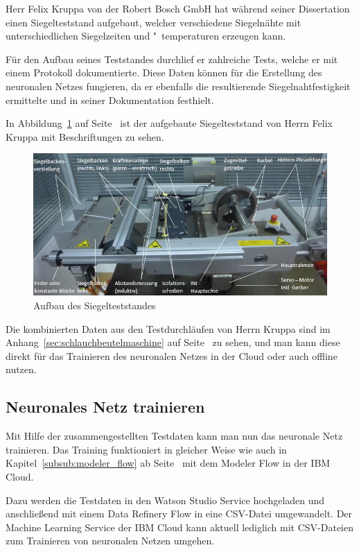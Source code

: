 Herr Felix Kruppa von der Robert Bosch GmbH hat während seiner Dissertation einen Siegelteststand aufgebaut, welcher
verschiedene Siegelnähte mit unterschiedlichen Siegelzeiten und "~temperaturen erzeugen kann.

Für den Aufbau seines Teststandes durchlief er zahlreiche Tests, welche er mit einem Protokoll dokumentierte. Diese
Daten können für die Erstellung des neuronalen Netzes fungieren, da er ebenfalls die resultierende Siegelnahtfestigkeit
ermittelte und in seiner Dokumentation festhielt.

In Abbildung~\ref{fig:siegelmaschinen_vffs_simulator} auf Seite~\pageref{fig:siegelmaschinen_vffs_simulator} ist der
aufgebaute Siegelteststand von Herrn Felix Kruppa mit Beschriftungen zu sehen.

\begin{figure}[h]
    \centering
    \includegraphics[width=\textwidth]{images/kapitel_5/vffs_simulator.png}
    \caption{Aufbau des Siegelteststandes}
    \label{fig:siegelmaschinen_vffs_simulator}
\end{figure}

Die kombinierten Daten aus den Testdurchläufen von Herrn Kruppa sind im Anhang~\ref{sec:schlauchbeutelmaschine}
auf Seite~\pageref{sec:schlauchbeutelmaschine} zu sehen, und man kann diese direkt für das Trainieren des neuronalen
Netzes in der Cloud oder auch offline nutzen.

\subsection{Neuronales Netz trainieren}
Mit Hilfe der zusammengestellten Testdaten kann man nun das neuronale Netz trainieren. Das Training funktioniert in
gleicher Weise wie auch in Kapitel~\ref{subsub:modeler_flow} ab Seite~\pageref{subsub:modeler_flow} mit dem Modeler
Flow in der IBM Cloud.

Dazu werden die Testdaten in den Watson Studio Service hochgeladen und anschließend mit einem Data Refinery Flow in eine
CSV-Datei umgewandelt. Der Machine Learning Service der IBM Cloud kann aktuell lediglich mit CSV-Dateien zum Trainieren
von neuronalen Netzen umgehen.

